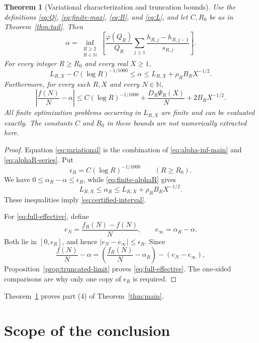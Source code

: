 \documentclass[11pt]{article}
\newtheorem{theorem}{Theorem}[section]
\theoremstyle{definition}
\theoremstyle{remark}
\numberwithin{equation}{section}
\newcommand{\N}{\mathbb N}
\begin{document}
\begin{theorem}[Variational characterization and truncation bounds]
\label{thm:effective}
Use the definitions
\eqref{eq:Q}, \eqref{eq:finite-max}, \eqref{eq:B}, and
\eqref{eq:L}, and let \(C,R_0\) be as in
Theorem~\ref{thm:tail}. Then
\begin{equation}\label{eq:variational}
 \boxed{\displaystyle
 \alpha=
 \inf_{\substack{R\ge2\\R\in\N}}
 \left[
 \frac{\varphi(Q_R)}{Q_R}
 \sum_{j\ge1}
 \frac{h_{R,j}-h_{R,j-1}}{s_{R,j}}
 \right].}
\end{equation}
For every integer \(R\ge R_0\) and every real \(X\ge1\),
\begin{equation}\label{eq:certified-interval}
 \boxed{\displaystyle
 L_{R,X}-C(\log R)^{-1/1000}
 \le\alpha
 \le L_{R,X}+\rho_RB_RX^{-1/2}.}
\end{equation}
Furthermore, for every such \(R,X\) and every \(N\in\N\),
\begin{equation}\label{eq:full-effective}
 \boxed{\displaystyle
 \left|\frac{f(N)}N-\alpha\right|
 \le C(\log R)^{-1/1000}
       +\frac{D_R\Psi_R(X)}N
       +2B_RX^{-1/2}.}
\end{equation}
All finite optimization problems occurring in \(L_{R,X}\) are finite
and can be evaluated exactly. The constants \(C\) and \(R_0\) in
these bounds are not numerically extracted here.
\end{theorem}

\begin{proof}
Equation \eqref{eq:variational} is the combination of
\eqref{eq:alpha-inf-main} and \eqref{eq:alphaR-series}.
Put
\[
 \epsilon_R=C(\log R)^{-1/1000}\qquad(R\ge R_0).
\]
We have \(0\le\alpha_R-\alpha\le\epsilon_R\), while
\eqref{eq:finite-alphaR} gives
\[
 L_{R,X}\le\alpha_R
 \le L_{R,X}+\rho_RB_RX^{-1/2}.
\]
These inequalities imply \eqref{eq:certified-interval}.

For \eqref{eq:full-effective}, define
\[
 e_N=\frac{f_R(N)-f(N)}N,\qquad
 e_\infty=\alpha_R-\alpha.
\]
Both lie in \([0,\epsilon_R]\), and hence
\(|e_N-e_\infty|\le\epsilon_R\). Since
\[
 \frac{f(N)}N-\alpha
 =
 \left(\frac{f_R(N)}N-\alpha_R\right)
 -(e_N-e_\infty),
\]
Proposition~\ref{prop:truncated-limit} proves
\eqref{eq:full-effective}. The one-sided comparisons are why
only one copy of \(\epsilon_R\) is required.
\end{proof}

Theorem~\ref{thm:effective} proves part (4) of
Theorem~\ref{thm:main}.

\section{Scope of the conclusion}
\end{document}
